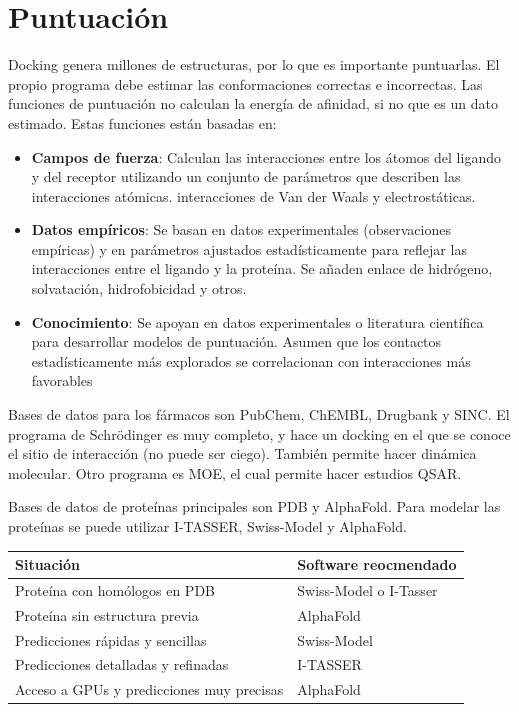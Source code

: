\section{Puntuación}
Docking genera millones de estructuras, por lo que es importante puntuarlas. El propio programa debe estimar las conformaciones correctas e incorrectas. Las funciones de puntuación no calculan la energía de afinidad, si no que es un dato estimado. Estas funciones están basadas en:
\begin{itemize}
\item \textbf{Campos de fuerza}: Calculan las interacciones entre los átomos del ligando y del receptor utilizando un conjunto de parámetros que describen las interacciones atómicas.
interacciones de Van der Waals y electrostáticas.
\item \textbf{Datos empíricos}: Se basan en datos experimentales (observaciones empíricas) y en parámetros ajustados estadísticamente para reflejar las interacciones entre el ligando y la proteína.
Se añaden enlace de hidrógeno, solvatación, hidrofobicidad y otros.
\item \textbf{Conocimiento}: Se apoyan en datos experimentales o literatura científica para desarrollar modelos de puntuación.
Asumen que los contactos estadísticamente más explorados se correlacionan con interacciones más favorables
\end{itemize}

Bases de datos para los fármacos son PubChem, ChEMBL, Drugbank y SINC. El programa de Schrödinger es muy completo, y hace un docking en el que se conoce el sitio de interacción (no puede ser ciego). También permite hacer dinámica molecular. Otro programa es MOE, el cual permite hacer estudios QSAR.

Bases de datos de proteínas principales son PDB y AlphaFold. Para modelar las proteínas se puede utilizar I-TASSER, Swiss-Model y AlphaFold. 

\begin{table}[h]
\centering
\begin{tabular}{l l}
Situación & Software reocmendado \\ \hline
Proteína con homólogos en PDB & Swiss-Model o I-Tasser \\
Proteína sin estructura previa & AlphaFold \\
Predicciones rápidas y sencillas & Swiss-Model \\
Predicciones detalladas y refinadas & I-TASSER \\
Acceso a GPUs y predicciones muy precisas & AlphaFold
\end{tabular}
\end{table}

